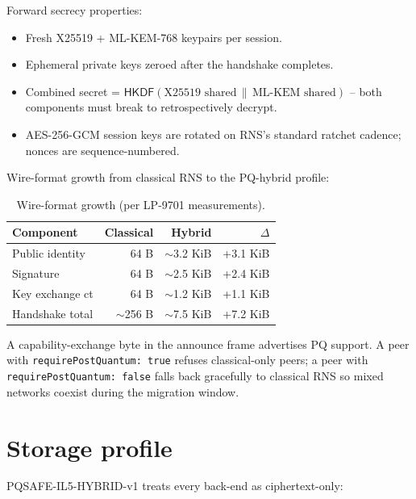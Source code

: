 \documentclass[11pt,a4paper]{article}
\begin{document}
Forward secrecy properties:
\begin{itemize}[leftmargin=*,itemsep=0pt]
\item Fresh X25519 + ML-KEM-768 keypairs per session.
\item Ephemeral private keys zeroed after the handshake completes.
\item Combined secret = $\textsf{HKDF}(\text{X25519 shared}\,\|\,
  \text{ML-KEM shared})$ -- both components must break to
  retrospectively decrypt.
\item AES-256-GCM session keys are rotated on RNS's standard ratchet
  cadence; nonces are sequence-numbered.
\end{itemize}

Wire-format growth from classical RNS to the PQ-hybrid profile:

\begin{table}[H]
\centering
\small
\begin{tabular}{l r r r}
\toprule
\textbf{Component} & \textbf{Classical} & \textbf{Hybrid} & \textbf{$\Delta$} \\
\midrule
Public identity & 64 B & $\sim$3.2 KiB & +3.1 KiB \\
Signature & 64 B & $\sim$2.5 KiB & +2.4 KiB \\
Key exchange ct & 64 B & $\sim$1.2 KiB & +1.1 KiB \\
Handshake total & $\sim$256 B & $\sim$7.5 KiB & +7.2 KiB \\
\bottomrule
\end{tabular}
\caption{Wire-format growth (per LP-9701 measurements).}
\end{table}

A capability-exchange byte in the announce frame advertises PQ
support. A peer with \texttt{requirePostQuantum: true} refuses
classical-only peers; a peer with \texttt{requirePostQuantum: false}
falls back gracefully to classical RNS so mixed networks coexist
during the migration window.

\section{Storage profile}
\label{sec:storage}

PQSAFE-IL5-HYBRID-v1 treats every back-end as ciphertext-only:
\end{document}

